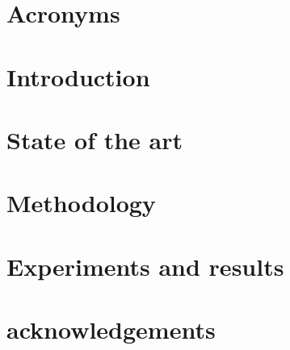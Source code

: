 \documentclass[12pt, a4paper]{article}
\begin{document}

% 

\newpage
{}
 

\tableofcontents\thispagestyle{empty}\newpage
\listoffigures\thispagestyle{empty}\newpage
\listoftables\thispagestyle{empty}\newpage

\section*{Acronyms}


\section{Introduction}
\label{sec:introduction}

\newpage

\section{State of the art}
\label{sec:sota}

\newpage

\section{Methodology}
\label{sec:methodology}

\newpage

\section{Experiments and results}
\label{sec:experiments_and_results}

\newpage

\newpage
\section*{acknowledgements}
\label{acknowledgements}

\newpage


\newpage\printbibliography
{}
\newpage

\begin{appendices}
  
\end{appendices}
\end{document}
